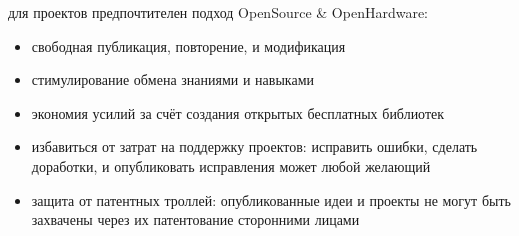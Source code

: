 \bigskip\noindent
для проектов предпочтителен подход OpenSource \& OpenHardware:
\begin{itemize}[nosep]
    \item свободная публикация, повторение, и модификация
    \item стимулирование обмена знаниями и навыками
    \item экономия усилий за счёт создания открытых бесплатных библиотек
    \item избавиться от затрат на поддержку проектов: исправить ошибки, сделать
    доработки, и опубликовать исправления может любой желающий
    \item защита от патентных троллей: опубликованные идеи и проекты не могут
    быть захвачены через их патентование сторонними лицами
\end{itemize}

\secup
